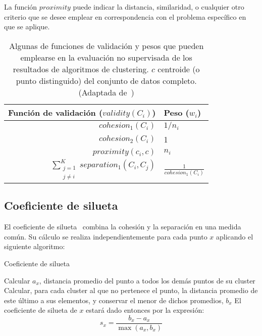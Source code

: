 La función $proximity$ puede indicar la distancia, similaridad, o cualquier otro criterio que se desee emplear en correspondencia con el problema específico en que se aplique.

\begin{table}[H]
    \centering
    \begin{tabular}{rl}
        \hline
        Función de validación ($validity(C_i)$)                        & Peso ($w_i$)                            \\                 \hline
        $cohesion_1(C_i)$                                              & $1/n_i$                                 \\
        $cohesion_2(C_i)$                                              & 1                                       \\
        $proximity(c_i , c)$                                           & $n_i$                                   \\
        $\sum_{\substack{j=1 \\ j\neq i}}^{K}{separation_1(C_i, C_j)}$ & $\frac{1}{cohesion_1(C_i)}$
    \end{tabular}
    \caption{Algunas de funciones de validación y pesos que pueden emplearse en la evaluación no supervisada de los resultados de algoritmos de clustering. $c$ centroide (o punto distinguido) del conjunto de datos completo.
    (Adaptada de~\cite{Tan05})}
    \label{table:validity-weights}
\end{table}

\subsection{Coeficiente de silueta}\label{subsec:coeficienteDeSilueta}

El coeficiente de silueta~\cite{Rousseeuw87, Tan05} combina la cohesión y la separación en una medida común.
Su cálculo se realiza independientemente para cada punto $x$ aplicando el siguiente algoritmo:

\begin{algorithm}
    \caption{Coeficiente de silueta}
    \label{algorithm:silohuette-coefficient}
    Calcular $a_x$, distancia promedio del punto a todos los demás puntos de su cluster\;
    Calcular, para cada cluster al que no pertenece el punto, la distancia promedio de este último a sus elementos, y conservar el menor de dichos promedios, $b_x$\;
    El coeficiente de silueta de $x$ estará dado entonces por la expresión:
    \begin{equation*}
        s_x = \frac{b_x - a_x}{\max{(a_x, b_x)}}
    \end{equation*}
\end{algorithm}

